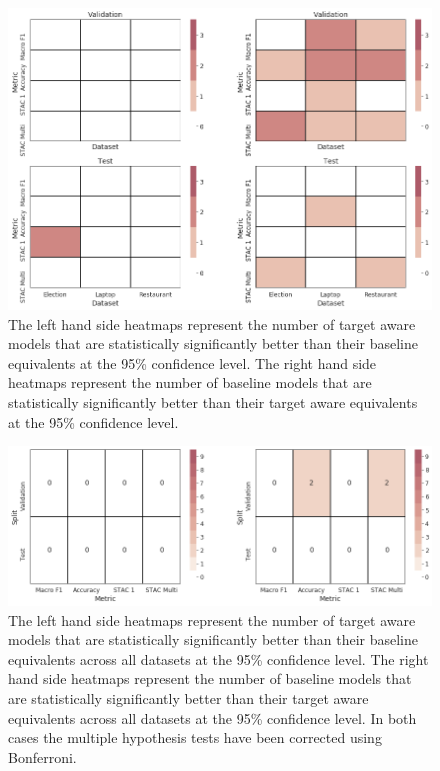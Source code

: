 \begin{figure}[!h]
    \centering
    \includegraphics[scale=0.35]{images/augmentation/methods_performance/Inter_Target/dataset_sig_scores_inter_target.png}
    \caption{The left hand side heatmaps represent the number of target aware models that are statistically significantly better than their baseline equivalents at the 95\% confidence level. The right hand side heatmaps represent the number of baseline models that are statistically significantly better than their target aware equivalents at the 95\% confidence level.}
    \label{fig:aug_dataset_sig_scores_inter_target}
\end{figure}
\begin{figure}[!h]
    \centering
    \includegraphics[scale=0.35]{images/augmentation/methods_performance/Inter_Target/combined_sig_scores_inter_target.png}
    \caption{The left hand side heatmaps represent the number of target aware models that are statistically significantly better than their baseline equivalents across all datasets at the 95\% confidence level. The right hand side heatmaps represent the number of baseline models that are statistically significantly better than their target aware equivalents across all datasets at the 95\% confidence level. In both cases the multiple hypothesis tests have been corrected using Bonferroni.}
    \label{fig:aug_combined_sig_scores_inter_target}
\end{figure}

